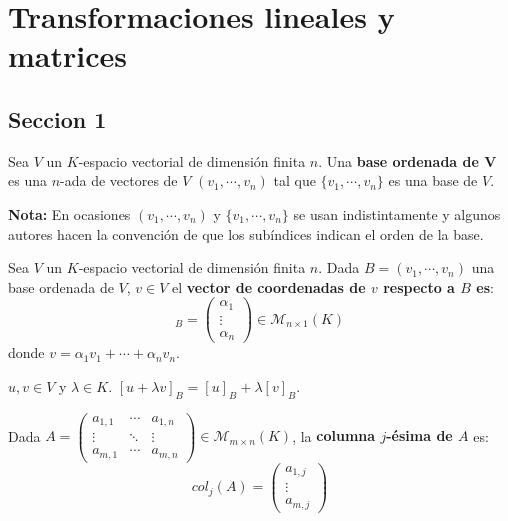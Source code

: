 \chapter{Transformaciones lineales y matrices}
\section{Seccion 1}
\begin{definition}{}{}
    Sea $V$ un $K$-espacio vectorial de dimensión finita $n$. Una \textbf{base ordenada de V} es una $n$-ada de vectores de $V \, \, (v_1, \cdots, v_n)$ tal que $\{v_1, \cdots, v_n\}$ es una base de $V$.
    
    \textbf{Nota: } En ocasiones $(v_1, \cdots, v_n)$ y $\{v_1, \cdots, v_n\}$ se usan indistintamente y algunos autores hacen la convención de que los subíndices indican el orden de la base.
\end{definition}
\begin{definition}{}{}
    Sea $V$ un $K$-espacio vectorial de dimensión finita $n$. Dada $B = (v_1, \cdots, v_n)$ una base ordenada de $V$, $v \in V$ el \textbf{vector de coordenadas de $v$ respecto a $B$ es}:
    \begin{equation*}
        [v]_B = \begin{pmatrix}
            \alpha_1\\
            \vdots\\
            \alpha_n
        \end{pmatrix} \in \mathcal{M}_{n\times 1}(K)
    \end{equation*}
    donde $v = \alpha_1 v_1 + \cdots + \alpha_n v_n$.
\end{definition}
\begin{obs}{}{}
    $u,v \in V$ y $\lambda \in K$. $[u + \lambda v]_B = [u]_B + \lambda [v]_B$.
\end{obs}
\begin{notation}{}{}
    Dada $A = \begin{pmatrix}
        a_{1,1} & \cdots & a_{1,n}\\
        \vdots & \ddots & \vdots\\
        a_{m,1} & \cdots & a_{m,n}
    \end{pmatrix} \in \mathcal{M}_{m \times n} (K)$, la \textbf{columna $j$-ésima de $A$} es:
    $$col_j(A) = \begin{pmatrix}
        a_{1,j}\\
        \vdots\\
        a_{m,j}
    \end{pmatrix} $$
\end{notation}
